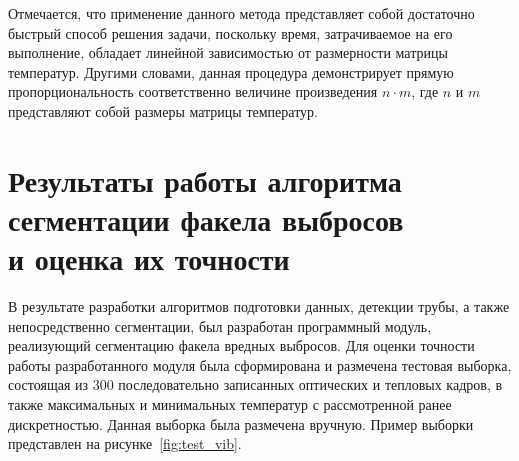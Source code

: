\documentclass[14pt, a4paper]{extreport}
\begin{document}
	Отмечается, что применение данного метода представляет собой достаточно быстрый способ решения задачи, поскольку время, затрачиваемое на его выполнение, обладает линейной зависимостью от размерности матрицы температур. Другими словами, данная процедура демонстрирует прямую пропорциональность соответственно величине произведения $n \cdot m$, где $n$ и $m$ представляют собой размеры матрицы температур.
	
\section[\vspace*{-0.22cm}Результаты работы алгоритма сегментации факела выбросов\\ \hspace*{-0.75cm}и оценка их точности]{\vspace*{-0.22cm}Результаты работы алгоритма сегментации факела выбросов\\ \hspace*{-2.05cm}и оценка их точности}

	В результате разработки алгоритмов подготовки данных, детекции трубы, а также непосредственно сегментации, был разработан программный модуль, реализующий сегментацию факела вредных выбросов. Для оценки точности работы разработанного модуля была сформирована и размечена тестовая выборка, состоящая из 300 последовательно записанных оптических и тепловых кадров, в также максимальных и минимальных температур с рассмотренной ранее дискретностью. Данная выборка была размечена вручную. Пример выборки представлен на рисунке~\ref{fig:test_vib}.
	
\end{document}
